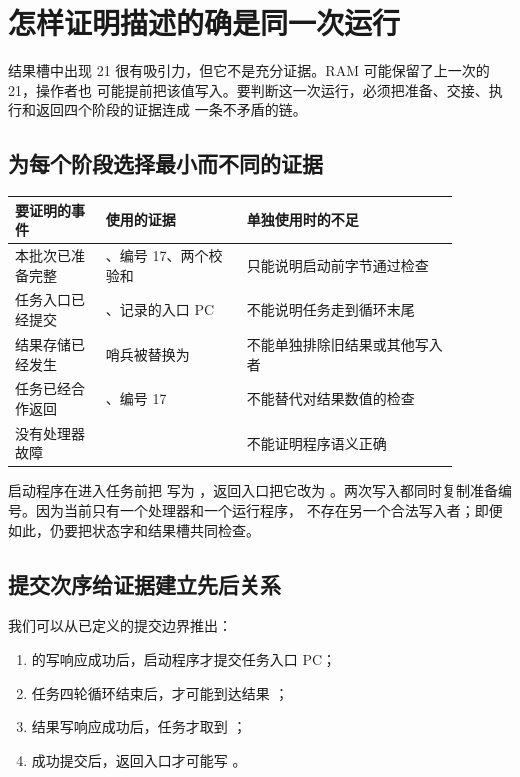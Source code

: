 \section{怎样证明描述的确是同一次运行}

结果槽中出现 21 很有吸引力，但它不是充分证据。RAM 可能保留了上一次的 21，操作者也
可能提前把该值写入。要判断这一次运行，必须把准备、交接、执行和返回四个阶段的证据连成
一条不矛盾的链。

\subsection{为每个阶段选择最小而不同的证据}

\begin{longtable}{|L{0.18\linewidth}|L{0.28\linewidth}|L{0.42\linewidth}|}
\hline
{}
要证明的事件 & 使用的证据 & 单独使用时的不足 \\ \hline
本批次已准备完整 & 、编号 17、两个校验和 & 只能说明启动前字节通过检查 \\ \hline
任务入口已经提交 & 、记录的入口 PC & 不能说明任务走到循环末尾 \\ \hline
结果存储已经发生 & 哨兵被替换为  & 不能单独排除旧结果或其他写入者 \\ \hline
任务已经合作返回 & 、编号 17 & 不能替代对结果数值的检查 \\ \hline
没有处理器故障 &  & 不能证明程序语义正确 \\ \hline
\end{longtable}

启动程序在进入任务前把  写为 ，返回入口把它改为
。两次写入都同时复制准备编号。因为当前只有一个处理器和一个运行程序，
不存在另一个合法写入者；即便如此，仍要把状态字和结果槽共同检查。

\subsection{提交次序给证据建立先后关系}

我们可以从已定义的提交边界推出：

\begin{enumerate}
\item {} 的写响应成功后，启动程序才提交任务入口 PC；
\item 任务四轮循环结束后，才可能到达结果 ；
\item 结果写响应成功后，任务才取到 ；
\item {} 成功提交后，返回入口才可能写 。
\end{enumerate}

